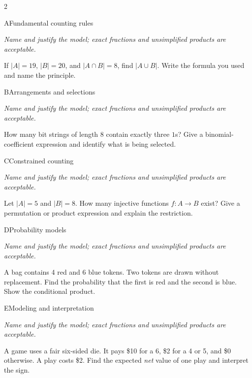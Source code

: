 \documentclass[9pt]{extarticle}
\begin{document}
\begin{multicols}{2}
\begin{CoreProblem}{A}{Fundamental counting rules}
{\scriptsize\textit{Name and justify the model; exact fractions and unsimplified products are acceptable.}\par}
If $|A|=19$, $|B|=20$, and $|A\cap B|=8$, find $|A\cup B|$. Write
    the formula you used and name the principle.
\end{CoreProblem}
\begin{CoreProblem}{B}{Arrangements and selections}
{\scriptsize\textit{Name and justify the model; exact fractions and unsimplified products are acceptable.}\par}
How many bit strings of length 8 contain exactly three $1$s? Give a
    binomial-coefficient expression and identify what is being selected.
\end{CoreProblem}
\begin{CoreProblem}{C}{Constrained counting}
{\scriptsize\textit{Name and justify the model; exact fractions and unsimplified products are acceptable.}\par}
Let $|A|=5$ and $|B|=8$. How many injective functions $f:A\to B$
    exist? Give a permutation or product expression and explain the restriction.
\end{CoreProblem}
\columnbreak
\begin{CoreProblem}{D}{Probability models}
{\scriptsize\textit{Name and justify the model; exact fractions and unsimplified products are acceptable.}\par}
A bag contains 4 red and 6 blue tokens. Two tokens are drawn without
    replacement. Find the probability that the first is red and the second is
    blue. Show the conditional product.
\end{CoreProblem}
\begin{CoreProblem}{E}{Modeling and interpretation}
{\scriptsize\textit{Name and justify the model; exact fractions and unsimplified products are acceptable.}\par}
A game uses a fair six-sided die. It pays \$10 for a 6, \$2 for a 4
    or 5, and \$0 otherwise. A play costs \$2. Find the expected \emph{net}
    value of one play and interpret the sign.
\end{CoreProblem}
\end{multicols}
\CoreWorkArea
\FormBreak
{}
\end{document}
